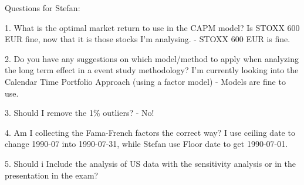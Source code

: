 Questions for Stefan:

1. What is the optimal market return to use in the CAPM model? Is STOXX 600 EUR fine, now that it is those stocks I'm analysing. 
- STOXX 600 EUR is fine. 

2. Do you have any suggestions on which model/method to apply when analyzing the long term effect in a event study methodology? I'm currently looking into the Calendar Time Portfolio Approach (using a factor model) - Models are fine to use. 

3. Should I remove the 1\% outliers?
- No!



4. Am I collecting the Fama-French factors the correct way? I use ceiling date to change 1990-07 into 1990-07-31, while Stefan use Floor date to get 1990-07-01.

5.  Should i Include the analysis of US data with the sensitivity analysis or in the presentation in the exam?